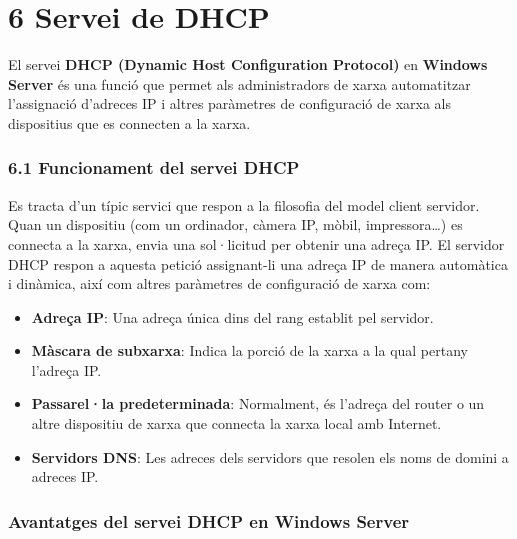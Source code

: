 \documentclass[
  a4paper,
]{article}
\providecommand{\tightlist}{%
  \setlength{\itemsep}{0pt}\setlength{\parskip}{0pt}}
\begin{document}
\section{6 Servei de DHCP}\label{servei-de-dhcp}

El servei \textbf{DHCP (Dynamic Host Configuration Protocol)} en
\textbf{Windows Server} és una funció que permet als administradors de
xarxa automatitzar l'assignació d'adreces IP i altres paràmetres de
configuració de xarxa als dispositius que es connecten a la xarxa.

\subsubsection{6.1 Funcionament del servei
DHCP}\label{funcionament-del-servei-dhcp}

Es tracta d'un típic servici que respon a la filosofia del model client
servidor. Quan un dispositiu (com un ordinador, càmera IP, mòbil,
impressora\ldots) es connecta a la xarxa, envia una sol·licitud per
obtenir una adreça IP. El servidor DHCP respon a aquesta petició
assignant-li una adreça IP de manera automàtica i dinàmica, així com
altres paràmetres de configuració de xarxa com:

\begin{itemize}
\tightlist
\item
  \textbf{Adreça IP}: Una adreça única dins del rang establit pel
  servidor.
\item
  \textbf{Màscara de subxarxa}: Indica la porció de la xarxa a la qual
  pertany l'adreça IP.
\item
  \textbf{Passarel·la predeterminada}: Normalment, és l'adreça del
  router o un altre dispositiu de xarxa que connecta la xarxa local amb
  Internet.
\item
  \textbf{Servidors DNS}: Les adreces dels servidors que resolen els
  noms de domini a adreces IP.
\end{itemize}

\subsubsection{Avantatges del servei DHCP en Windows
Server}\label{avantatges-del-servei-dhcp-en-windows-server}
\end{document}
